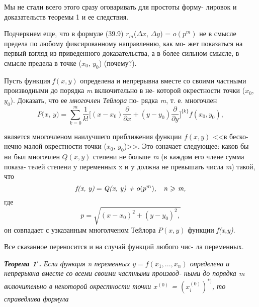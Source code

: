 \documentclass[10pt]{book}
\renewcommand{\geq}{\geqslant}
\begin{document}
\begin{spacing}{0.96}
	   Мы не стали всего этого сразу оговаривать для простоты форму-\linebreak
	   лировок и доказательств теоремы 1 и ее следствия.
		
		Подчеркнем еще, что в формуле (39.9) $r_m$($\Delta x$, $\Delta y$) = $o(p^m)$ \linebreak
		не в смысле предела по любому фиксированному направлению, как мо- \linebreak
		жет показаться на первый взгляд из приведенного доказательства,\linebreak
		а в более сильном смысле, в смысле предела в точке  ($x_0$, $y_0$) (почему?).
	\end{spacing}		
		\setlength{\parskip}{0.05cm}
	\begin{spacing}{0.9}
		\footnotesize{ Пусть функция \textit {f}$(x, y)$ определена и непрерывна \linebreak
		вместе со своими частными производными до порядка \textit {m}  включительно в не- \linebreak
		которой окрестности точки ($x_0$, $y_0$). Доказать, что ее \textit {многочлен Тейлора} по- \linebreak рядка \textit {m}, т. е. многочлен \scriptsize{
		$$\textit{P(x, y)} = \sum\limits_{k = 0}^m \frac{1}{k!} \bigl[(x- x_0) \frac{\partial}{\partial x} + (y- y_0) \frac{\partial}{\partial y}\bigr]^{\{k\}} \textit {f}(x_0, y_0) ,$$}
	
		\noindent является многочленом наилучшего приближения функции $\textit{f}(x, y)$ <<в беско- \linebreak
		нечно малой окрестности точки ($x_0$, $y_0$)>>. Это означает следующее: каков бы ни \linebreak
		был многочлен $Q(x, y)$ степени не больше \textit {m} (в каждом его члене сумма показа- \linebreak
		телей степени y переменных x и y должна не превышать числа \textit{m}) такой, что
		 \scriptsize{	$$\textit {f(x, y)} = \textit{Q(x, y) + $o(p^m)$,\quad n $\geq$ m,}$$}
		\noindent где  \scriptsize{ $$p=\sqrt{(x - x_0)^2 + (y-y_0)^2,}$$ } он совпадает с узказанным многолченом Тейлора $P(x, y)$ функции  \textit{f(x,y)}. 
		}
	\end{spacing}	
	    Все сказанное переносится и на случай функций любого чис- \linebreak
	    ла переменных.
	   
	    \textit{\textbf{Теорема 1$'$.} Если функция n переменных $y = \textit{f}(x_1, ..., x_n)$ \linebreak определена и непрерывна вместе со всеми своими частными производ- \linebreak
	    ными до порядка \textit {m} включительно в некоторой окрестности точки
	    	$x^{(0)}$ = $(x_{i}^{(0)})^{*)}$, то справедлива формула}
	   
\end{document}
